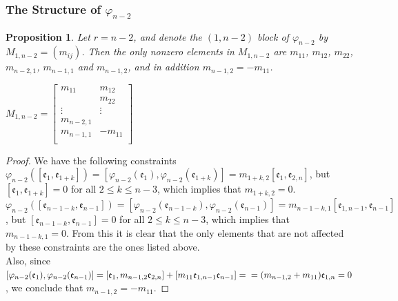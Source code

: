 \documentclass{article}
\newtheorem{proposition}[theorem]{Proposition}
\newcommand{\e}{\mathfrak{e}}
\begin{document}
\subsubsection{The Structure of $\varphi_{n-2}$}
\begin{proposition}
Let $r=n-2$, and denote the $(1,n-2)$ block of $\varphi_{n-2}$ by $M_{1,n-2}=(m_{ij})$. Then the only nonzero elements in $M_{1,n-2}$ are $m_{11}$, $m_{12}$, $m_{22}$, $m_{n-2,1}$, $m_{n-1,1}$ and $m_{n-1,2}$, and in addition $m_{n-1,2}=-m_{11}$.
\end{proposition}
$M_{1,n-2}=\begin{bmatrix}
m_{11}&m_{12}\\
&m_{22}\\
\vdots&\vdots\\
m_{n-2,1}&\\
m_{n-1,1}&-m_{11}\\
\end{bmatrix}$
\begin{proof}
We have the following constraints\\
$\varphi_{n-2}([\e_1,\e_{1+k}])=[\varphi_{n-2}(\e_1),\varphi_{n-2}(\e_{1+k})]=m_{1+k,2}[\e_1,\e_{2,n}]$, but $[\e_1,\e_{1+k}]=0$ for all $2\leq{k}\leq{n-3}$, which implies that $m_{1+k,2}=0$.\\
$\varphi_{n-2}([\e_{n-1-k},\e_{n-1}])=[\varphi_{n-2}(\e_{n-1-k}),\varphi_{n-2}(\e_{n-1})]=m_{n-1-k,1}[\e_{1,n-1},\e_{n-1}]$, but $[\e_{n-1-k},\e_{n-1}]=0$ for all $2\leq{k}\leq{n-3}$, which implies that $m_{n-1-k,1}=0$.
From this it is clear that the only elements that are not affected by these constraints are the ones listed above.\\
Also, since $[\varphi_{n-2}(\e_1),\varphi_{n-2}(\e_{n-1})]=[\e_1,m_{n-1,2}\e_{2,n}]+[m_{11}\e_{1,n-1}\e_{n-1}]=\\=(m_{n-1,2}+m_{11})\e_{1,n}=0$, we conclude that $m_{n-1,2}=-m_{11}$.
\end{proof}

\end{document}
